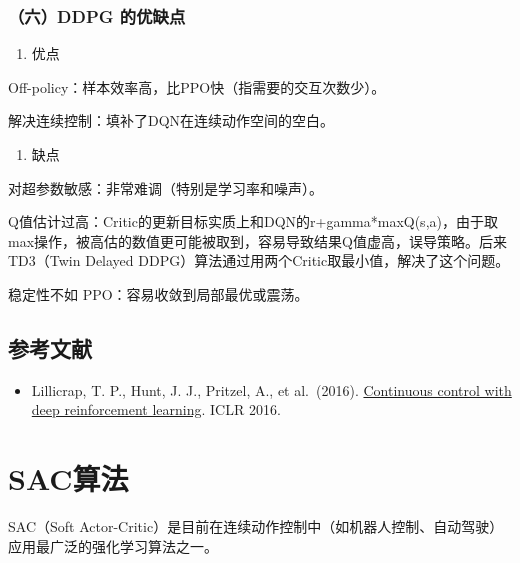 \hypertarget{ux516dddpg-ux7684ux4f18ux7f3aux70b9}{%
\subsubsection{（六）DDPG 的优缺点}\label{ux516dddpg-ux7684ux4f18ux7f3aux70b9}}

\begin{enumerate}
\def\labelenumi{\arabic{enumi}.}
\tightlist
\item
  优点
\end{enumerate}

Off-policy：样本效率高，比PPO快（指需要的交互次数少）。

解决连续控制：填补了DQN在连续动作空间的空白。

\begin{enumerate}
\def\labelenumi{\arabic{enumi}.}
\setcounter{enumi}{1}
\tightlist
\item
  缺点
\end{enumerate}

对超参数敏感：非常难调（特别是学习率和噪声）。

Q值估计过高：Critic的更新目标实质上和DQN的r+gamma*maxQ(s,a)，由于取max操作，被高估的数值更可能被取到，容易导致结果Q值虚高，误导策略。后来TD3（Twin Delayed DDPG）算法通过用两个Critic取最小值，解决了这个问题。

稳定性不如 PPO：容易收敛到局部最优或震荡。

\hypertarget{ux53c2ux8003ux6587ux732e-58}{%
\subsection{参考文献}\label{ux53c2ux8003ux6587ux732e-58}}

\begin{itemize}
\tightlist
\item
  Lillicrap, T. P., Hunt, J. J., Pritzel, A., et al.~(2016). \href{https://arxiv.org/abs/1509.02971}{Continuous control with deep reinforcement learning}. ICLR 2016.
\end{itemize}

\clearpage

\hypertarget{sacux7b97ux6cd5}{%
\section{SAC算法}\label{sacux7b97ux6cd5}}

SAC（Soft Actor-Critic）是目前在连续动作控制中（如机器人控制、自动驾驶）应用最广泛的强化学习算法之一。

